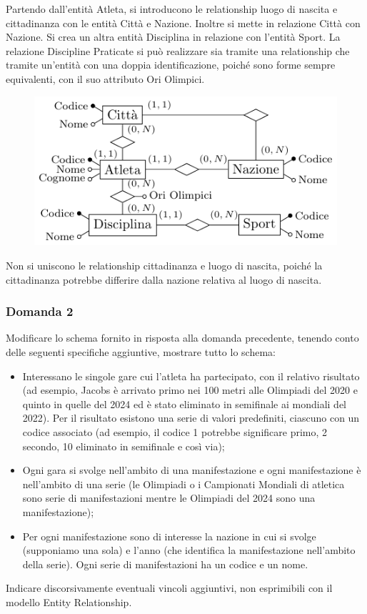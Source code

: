 \documentclass{article}
\begin{document}
Partendo dall'entità Atleta, si introducono le relationship luogo di nascita e cittadinanza con le entità Città e Nazione. Inoltre si mette in relazione Città con Nazione. 
Si crea un altra entità Disciplina in relazione con l'entità Sport. 
La relazione Discipline Praticate si può realizzare sia tramite una relationship che tramite un'entità con una doppia identificazione, poiché sono forme sempre equivalenti, con il suo attributo Ori Olimpici. 

\begin{figure}[H]%
    \centering%
    \includegraphics[scale=1.25]{schema_1_16-12-24.pdf}%
\end{figure}

Non si uniscono le relationship cittadinanza e luogo di nascita, poiché la cittadinanza potrebbe differire dalla nazione relativa al luogo di nascita. 

\subsubsection*{Domanda 2}

Modificare lo schema fornito in risposta alla domanda precedente, tenendo conto delle seguenti specifiche
aggiuntive, mostrare tutto lo schema:
\begin{itemize}
    \item Interessano le singole gare cui l'atleta ha partecipato, con il relativo risultato (ad esempio,
    Jacobs è arrivato primo nei 100 metri alle Olimpiadi del 2020 e quinto in quelle del 2024 ed è
    stato eliminato in semifinale ai mondiali del 2022). Per il risultato esistono una serie di valori
    predefiniti, ciascuno con un codice associato (ad esempio, il codice 1 potrebbe significare primo,
    2 secondo, 10 eliminato in semifinale e così via);
    \item Ogni gara si svolge nell'ambito di una manifestazione e ogni manifestazione è nell'ambito di una
    serie (le Olimpiadi o i Campionati Mondiali di atletica sono serie di manifestazioni mentre le
    Olimpiadi del 2024 sono una manifestazione);
    \item Per ogni manifestazione sono di interesse la nazione in cui si svolge (supponiamo una sola) e
    l'anno (che identifica la manifestazione nell'ambito della serie). Ogni serie di manifestazioni ha
    un codice e un nome.
\end{itemize}
Indicare discorsivamente eventuali vincoli aggiuntivi, non esprimibili con il modello Entity Relationship.
\end{document}
